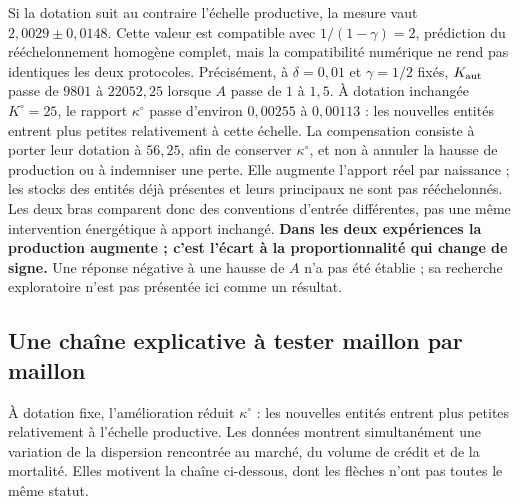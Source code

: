 Si la dotation suit au contraire l'échelle productive, la mesure vaut
$2{,}0029\pm0{,}0148$. Cette valeur est compatible avec
$1/(1-\gamma)=2$, prédiction du rééchelonnement homogène complet,
mais la compatibilité numérique ne rend pas identiques les deux protocoles.
Précisément, à $\delta=0{,}01$ et $\gamma=1/2$ fixés,
$K_{\rm aut}$ passe de $9801$ à $22052{,}25$ lorsque $A$ passe de
$1$ à $1{,}5$. À dotation inchangée $K^\circ=25$, le rapport
$\kappa^\circ$ passe d'environ $0{,}00255$ à $0{,}00113$ : les
nouvelles entités entrent plus petites relativement à cette échelle.
La compensation consiste à porter leur dotation à $56{,}25$, afin
de conserver $\kappa^\circ$, et non à annuler la hausse de production
ou à indemniser une perte. Elle augmente l'apport réel par naissance ;
les stocks des entités déjà présentes et leurs principaux ne sont pas
rééchelonnés. Les deux bras comparent donc des conventions d'entrée
différentes, pas une même intervention énergétique à apport inchangé.
\textbf{Dans les deux expériences la production augmente ; c'est l'écart
à la proportionnalité qui change de signe.} Une réponse négative à une
hausse de $A$ n'a pas été établie ; sa recherche exploratoire n'est pas
présentée ici comme un résultat.

\subsection{Une chaîne explicative à tester maillon par maillon}
À dotation fixe, l'amélioration réduit $\kappa^\circ$ : les nouvelles
entités entrent plus petites relativement à l'échelle productive.
Les données montrent simultanément une variation de la dispersion rencontrée
au marché, du volume de crédit et de la mortalité. Elles motivent la chaîne
ci-dessous, dont les flèches n'ont pas toutes le même statut.

